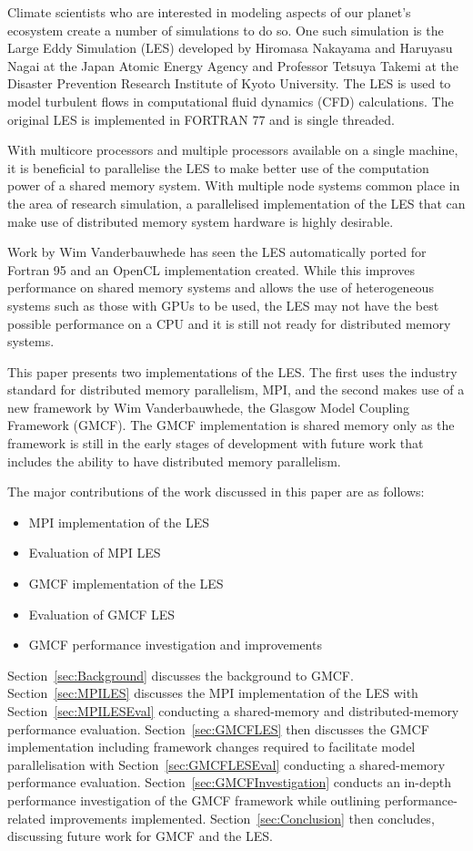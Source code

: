 Climate scientists who are interested in modeling aspects of our planet's
ecosystem create a number of simulations to do so. One such simulation is the
Large Eddy Simulation (LES) developed by Hiromasa Nakayama and Haruyasu Nagai at
the Japan Atomic Energy Agency and Professor Tetsuya Takemi at the Disaster
Prevention Research Institute of Kyoto University. The LES is used to model
turbulent flows in computational fluid dynamics (CFD) calculations. The original
LES is implemented in FORTRAN 77 and is single threaded.

With multicore processors and multiple processors available on a single machine,
it is beneficial to parallelise the LES to make better use of the computation
power of a shared memory system. With multiple node systems common place in the
area of research simulation, a parallelised implementation of the LES that can
make use of distributed memory system hardware is highly desirable.

Work by Wim Vanderbauwhede has seen the LES automatically ported for Fortran 95
and an OpenCL implementation created. While this improves performance on shared
memory systems and allows the use of heterogeneous systems such as those with
GPUs to be used, the LES may not have the best possible performance on a CPU and
it is still not ready for distributed memory systems.

This paper presents two implementations of the LES. The first uses the industry
standard for distributed memory parallelism, MPI, and the second makes use of a
new framework by Wim Vanderbauwhede, the Glasgow Model Coupling Framework
(GMCF). The GMCF implementation is shared memory only as the framework is still
in the early stages of development with future work that includes the ability to
have distributed memory parallelism.

The major contributions of the work discussed in this paper are as follows:

\begin{itemize}[noitemsep,nolistsep]
    \item MPI implementation of the LES
    \item Evaluation of MPI LES
    \item GMCF implementation of the LES
    \item Evaluation of GMCF LES
    \item GMCF performance investigation and improvements
\end{itemize}

Section~\ref{sec:Background} discusses the background to GMCF.
Section~\ref{sec:MPILES} discusses the MPI implementation of the LES with
Section~\ref{sec:MPILESEval} conducting a shared-memory and distributed-memory
performance evaluation. Section~\ref{sec:GMCFLES} then discusses the GMCF
implementation including framework changes required to facilitate model
parallelisation with Section~\ref{sec:GMCFLESEval} conducting a shared-memory
performance evaluation. Section~\ref{sec:GMCFInvestigation} conducts an in-depth
performance investigation of the GMCF framework while outlining
performance-related improvements implemented. Section~\ref{sec:Conclusion} then
concludes, discussing future work for GMCF and the LES.
